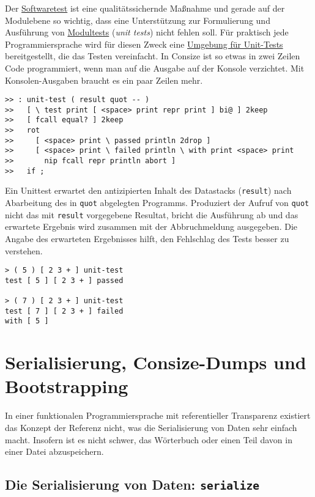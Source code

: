 Der \href{http://de.wikipedia.org/wiki/Softwaretest}{Softwaretest} ist eine qualitätssichernde Maßnahme und gerade auf der Modulebene so wichtig, dass eine Unterstützung zur Formulierung und Ausführung von \href{http://de.wikipedia.org/wiki/Modultest}{Modultests} (\emph{unit tests}) nicht fehlen soll. Für praktisch jede Programmiersprache wird für diesen Zweck eine \href{http://de.wikipedia.org/wiki/Liste\_von\_Modultest-Software}{Umgebung für Unit-Tests} bereitgestellt, die das Testen vereinfacht. In Consize ist so etwas in zwei Zeilen Code programmiert, wenn man auf die Ausgabe auf der Konsole verzichtet. Mit Konsolen-Ausgaben braucht es ein paar Zeilen mehr.

\begin{verbatim}
>> : unit-test ( result quot -- )
>>   [ \ test print [ <space> print repr print ] bi@ ] 2keep 
>>   [ fcall equal? ] 2keep
>>   rot
>>     [ <space> print \ passed println 2drop ]
>>     [ <space> print \ failed println \ with print <space> print
>>       nip fcall repr println abort ]
>>   if ;
\end{verbatim}

Ein Unittest erwartet den antizipierten Inhalt des Datastacks (\verb|result|) nach Abarbeitung des in \verb|quot| abgelegten Programms. Produziert der Aufruf von \verb|quot| nicht das mit \verb|result| vorgegebene Resultat, bricht die Ausführung ab und das erwartete Ergebnis wird zusammen mit der Abbruchmeldung ausgegeben. Die Angabe des erwarteten Ergebnisses hilft, den Fehlschlag des Tests besser zu verstehen.

\begin{verbatim}
> ( 5 ) [ 2 3 + ] unit-test
test [ 5 ] [ 2 3 + ] passed

> ( 7 ) [ 2 3 + ] unit-test
test [ 7 ] [ 2 3 + ] failed
with [ 5 ]
\end{verbatim}

\section{Serialisierung, Consize-Dumps und Bootstrapping}

In einer funktionalen Programmiersprache mit referentieller Transparenz existiert das Konzept der Referenz nicht, was die Serialisierung von Daten sehr einfach macht. Insofern ist es nicht schwer, das Wörterbuch oder einen Teil davon in einer Datei abzuspeichern.

\subsection{Die Serialisierung von Daten: \texttt{serialize}}

